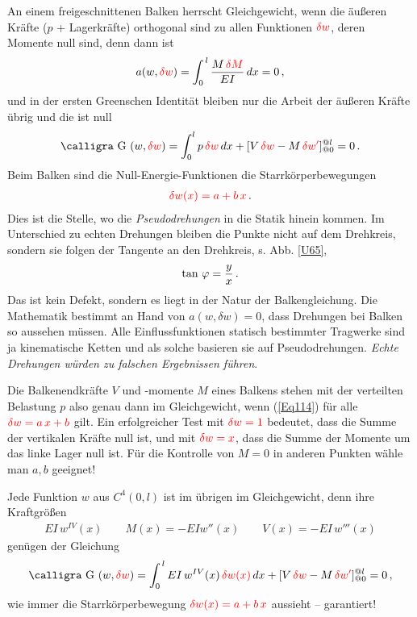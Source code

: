 {{{{{An einem freigeschnittenen Balken herrscht Gleichgewicht, wenn die \"{a}u{\ss}eren Kr\"{a}fte ($p$ + Lagerkr\"{a}fte) orthogonal sind zu allen  Funktionen $\textcolor{red}{\delta w}$, deren Momente null sind, denn dann ist
\begin{align}
a(w,\textcolor{red}{\delta w}) = \int_0^{\,l} \frac{M\,\textcolor{red}{\delta M}}{EI}\,dx = 0\,,
\end{align}
und in der ersten Greenschen Identit\"{a}t bleiben nur die Arbeit der \"{a}u{\ss}eren Kr\"{a}fte \"{u}brig und die ist null
\begin{align}\label{Eq114}
\text{\normalfont\calligra G\,\,}(w,\textcolor{red}{\delta w}) = \int_0^{l} p\,\textcolor{red}{\delta w}\,dx + [V\,\textcolor{red}{\delta w} - M\,\textcolor{red}{\delta w'}]_{@0}^{@l} = 0\,.
\end{align}
Beim Balken sind die \glq Null-Energie\grq{}-Funktionen die Starrk\"{o}rperbewegungen
\begin{align}
\textcolor{red}{\delta w(x) = a + b\,x}\,.
\end{align}
Dies ist die Stelle, wo die {\em Pseudodrehungen\/} in die Statik hinein kommen. Im Unterschied zu echten Drehungen bleiben die Punkte nicht auf dem Drehkreis, sondern sie folgen der Tangente an den Drehkreis, s. Abb. \ref{U65},
\begin{align}
\tan\,\varphi = \frac{y}{x}\,.
\end{align}
Das ist kein \glq Defekt\grq{}, sondern es liegt in der Natur der Balkengleichung. Die Mathematik bestimmt an Hand von $a(w,\delta w) = 0$, dass Drehungen bei Balken so aussehen m\"{u}ssen. Alle Einflussfunktionen statisch bestimmter Tragwerke sind ja kinematische Ketten und als solche basieren sie auf Pseudodrehungen. {\em Echte Drehungen w\"{u}rden zu falschen Ergebnissen f\"{u}hren\/}.

Die Balkenendkr\"{a}fte $V$ und -momente $M$ eines Balkens stehen mit der verteilten Belastung  $p$ also genau dann im Gleichgewicht, wenn (\ref{Eq114}) f\"{u}r alle $\textcolor{red}{\delta w = a\,x + b }$ gilt. Ein erfolgreicher Test mit $\textcolor{red}{\delta w = 1}$ bedeutet, dass die Summe der vertikalen Kr\"{a}fte null ist, und mit $\textcolor{red}{\delta w = x}$, dass die Summe der Momente um das linke Lager  null ist. F\"{u}r die Kontrolle von $M = 0$ in anderen Punkten w\"{a}hle man $a, b$ geeignet!

Jede Funktion $w $ aus $C^4(0,l)$ ist im \"{u}brigen im Gleichgewicht, denn ihre Kraftgr\"{o}{\ss}en
\begin{align}
EI\,w^{IV}(x) \qquad M(x) = - EI w''(x) \qquad V(x)= - EI\,w'''(x)
\end{align}
gen\"{u}gen der Gleichung
\begin{align}
\text{\normalfont\calligra G\,\,}(w,\textcolor{red}{\delta w}) = \int_0^{\,l} EI\,w^{IV}(x)\,\textcolor{red}{\delta w(x)}\,dx + [V\,\textcolor{red}{\delta w} - M\,\textcolor{red}{\delta w'}]_{@0}^{@l} = 0\,,
\end{align}
wie immer die Starrk\"{o}rperbewegung $\textcolor{red}{\delta w(x) = a + b\,x}$ aussieht -- garantiert!

}}}}}
